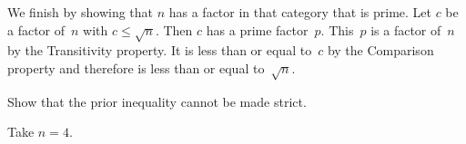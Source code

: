 \documentclass{test}  %
\begin{document}
\begin{problem}
\begin{exes}
\begin{answer}
  We finish by showing that $n$ has a factor in that category that is prime.
  Let $c$ be a factor of~$n$ with $c\leq\sqrt{n}$.
  Then $c$ has a prime factor~$p$.
  This~$p$ is a factor of~$n$ by the Transitivity property. 
  It is 
  less than or equal to~$c$ by the Comparison property and therefore
  is less than or equal to~$\sqrt{n}$.    
\end{answer}
\begin{exercise} 
  Show that the prior inequality cannot be made strict.
\end{exercise}
\begin{answer}
  Take $n=4$.  
\end{answer}
\end{exes}



\end{problem}
\end{document}

